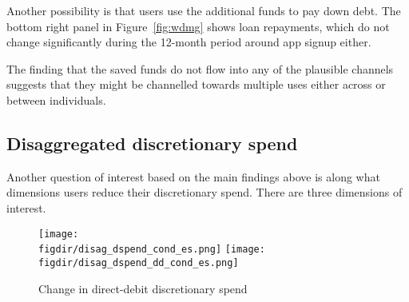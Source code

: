 Another possibility is that users use the additional funds to pay down debt.
The bottom right panel in Figure~\ref{fig:wdmg} shows loan repayments, which do
not change significantly during the 12-month period around app signup either.

The finding that the saved funds do not flow into any of the plausible channels
suggests that they might be channelled towards multiple uses either across or
between individuals.


\subsection{Disaggregated discretionary spend}%
\label{sub:disaggregated_discretionary_spend}

Another question of interest based on the main findings above is along what
dimensions users reduce their discretionary spend. There are three dimensions of
interest.

\begin{figure}[h]
    \centering
    \caption{Change in direct-debit discretionary spend}%
    \label{fig:disagg_dd}
    \texttt{[image: \\figdir/disag\_dspend\_cond\_es.png]}
    \texttt{[image: \\figdir/disag\_dspend\_dd\_cond\_es.png]}
\end{figure}

